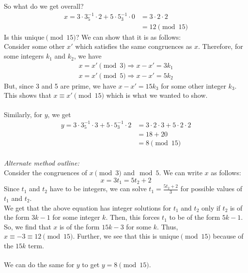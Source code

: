 \documentclass[]{article}
\begin{document}
\begin{qunlist}
{{\begin{enumerate}
      \newpage
      So what do we get overall?
      \begin{align*}
	x = 3 \cdot 3^{-1}_5 \cdot 2 + 5 \cdot 5^{-1}_3 \cdot 0 &= 3 \cdot 2 \cdot 2 \\
	&= 12 \pmod {15}
      \end{align*}
      Is this unique$\pmod{15}$? We can show that it is as follows:\\
      Consider some other $x'$ which satisfies the same congruences as $x$. Therefore, for some integers $k_1$ and $k_2$, we have
      \begin{align*}
	x = x'\pmod 3 \Rightarrow x - x' = 3k_1\\
	x = x'\pmod 5 \Rightarrow x - x' = 5k_2
      \end{align*}
      But, since 3 and 5 are prime, we have $x - x' = 15k_3$ for some other integer $k_3$.
      \\This shows that $x \equiv x'\pmod{15}$ which is what we wanted to show.
      \\\\Similarly, for $y$, we get
      \begin{align*}
	y = 3 \cdot 3^{-1}_5 \cdot 3 + 5 \cdot 5^{-1}_3 \cdot 2 &= 3 \cdot 2 \cdot 3 + 5 \cdot 2 \cdot 2 \\
	&= 18 + 20 \\
	&= 8 \pmod{15} \\
      \end{align*}

      \textit{Alternate method outline:}\\
      Consider the congruences of $x\pmod 3$ and$\mod 5$. We can write $x$ as follows:
      $$x = 3t_1 = 5t_2 + 2$$
      Since $t_1$ and $t_2$ have to be integers, we can solve $t_1 = \frac{5t_2 + 2}{3}$ for possible values of $t_1$ and $t_2$.\\
      We get that the above equation has integer solutions for $t_1$ and $t_2$ only if $t_2$ is of the form $3k - 1$ for some integer $k$. Then, this forces $t_1$ to be of the form $5k-1$.\\
      So, we find that $x$ is of the form $15k-3$ for some $k$. Thus, $x \equiv -3 \equiv 12\pmod{15}$. Further, we see that this is unique$\pmod{15}$ because of the $15k$ term.\\\\
      We can do the same for $y$ to get $y = 8\pmod{15}$.\\\\
  \end{enumerate}
}}\fi



\end{qunlist}
\end{document}
